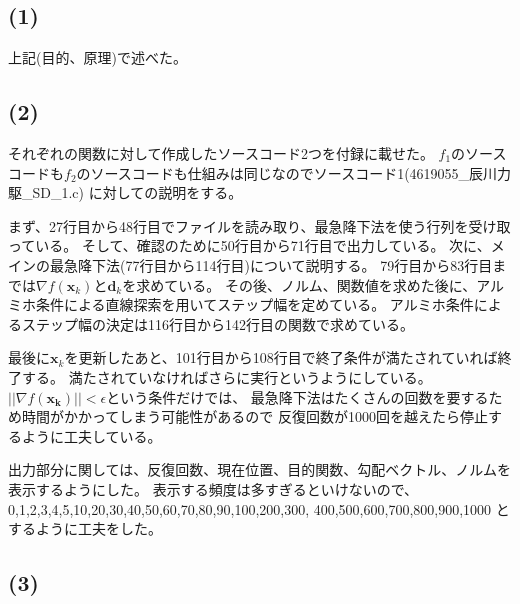 \documentclass[12pt]{jarticle}
\begin{document}
\subsection*{(1)}
上記(目的、原理)で述べた。
\subsection*{(2)}
それぞれの関数に対して作成したソースコード2つを付録に載せた。
$f_1$のソースコードも$f_2$のソースコードも仕組みは同じなのでソースコード1(4619055\_辰川力駆\_SD\_1.c)
に対しての説明をする。

まず、27行目から48行目でファイルを読み取り、最急降下法を使う行列を受け取っている。
そして、確認のために50行目から71行目で出力している。
次に、メインの最急降下法(77行目から114行目)について説明する。
79行目から83行目までは$\nabla f(\boldsymbol{x}_k)$と$\boldsymbol{d}_k$を求めている。
その後、ノルム、関数値を求めた後に、アルミホ条件による直線探索を用いてステップ幅を定めている。
アルミホ条件によるステップ幅の決定は116行目から142行目の関数で求めている。

最後に$\boldsymbol{x}_k$を更新したあと、101行目から108行目で終了条件が満たされていれば終了する。
満たされていなければさらに実行というようにしている。
$||\nabla f(\boldsymbol{x_k})||<\epsilon$という条件だけでは、
最急降下法はたくさんの回数を要するため時間がかかってしまう可能性があるので
反復回数が1000回を越えたら停止するように工夫している。

出力部分に関しては、反復回数、現在位置、目的関数、勾配ベクトル、ノルムを表示するようにした。
表示する頻度は多すぎるといけないので、0,1,2,3,4,5,10,20,30,40,50,60,70,80,90,100,200,300,
400,500,600,700,800,900,1000
とするように工夫をした。

\subsection*{(3)}
\end{document}
